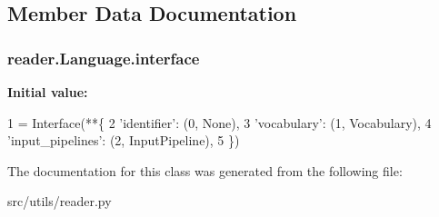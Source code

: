 \subsection{Member Data Documentation}
\subsubsection[{\texorpdfstring{interface}{interface}}]{\setlength{\rightskip}{0pt plus 5cm}reader.\+Language.\+interface\hspace{0.3cm}{\ttfamily [static]}}\hypertarget{classreader_1_1Language_abb22a3a50e7636396663c49211fd97b3}{}\label{classreader_1_1Language_abb22a3a50e7636396663c49211fd97b3}
{\bfseries Initial value\+:}
\begin{DoxyCode}
1 = Interface(**\{
2         \textcolor{stringliteral}{'identifier'}:           (0, \textcolor{keywordtype}{None}),
3         \textcolor{stringliteral}{'vocabulary'}:           (1, Vocabulary),
4         \textcolor{stringliteral}{'input\_pipelines'}:      (2, InputPipeline),
5     \})
\end{DoxyCode}


The documentation for this class was generated from the following file\+:\begin{DoxyCompactItemize}
\item 
src/utils/reader.\+py\end{DoxyCompactItemize}
